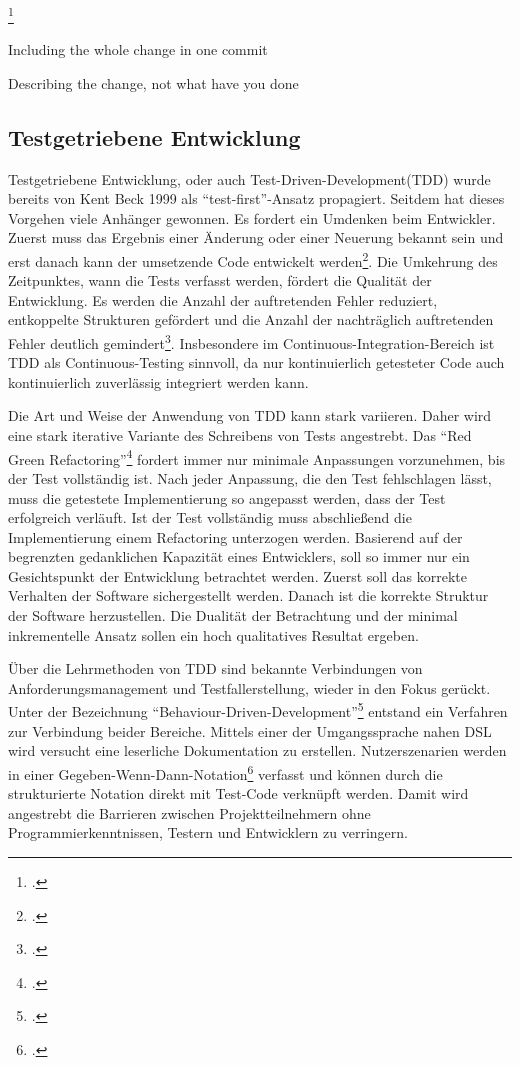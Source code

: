 \footcite[Writing commit messages before starting to code][]{git-essentials-2017}

Including the whole change in one commit

Describing the change, not what have you done

\subsection{Testgetriebene Entwicklung}
\label{test-driven-development}

Testgetriebene Entwicklung, oder auch Test-Driven-Development(TDD) wurde bereits von Kent Beck 1999 als ``test-first''-Ansatz propagiert. Seitdem hat dieses Vorgehen viele Anhänger gewonnen. Es fordert ein Umdenken beim Entwickler. Zuerst muss das Ergebnis einer Änderung oder einer Neuerung bekannt sein und erst danach kann der umsetzende Code entwickelt werden\footcite[vgl.][Kap. Understanding TDD]{tdd-java}. Die Umkehrung des Zeitpunktes, wann die Tests verfasst werden, fördert die Qualität der Entwicklung. Es werden die Anzahl der auftretenden Fehler reduziert, entkoppelte Strukturen gefördert und die Anzahl der nachträglich auftretenden Fehler deutlich gemindert\footcite[vgl.][]{tdd-ci-effectivness}.
Insbesondere im Continuous-Integration-Bereich ist TDD als Continuous-Testing sinnvoll, da nur kontinuierlich getesteter Code auch kontinuierlich zuverlässig integriert werden kann.

Die Art und Weise der Anwendung von TDD kann stark variieren. Daher wird eine stark iterative Variante des Schreibens von Tests angestrebt. Das ``Red Green Refactoring''\footcite[vgl.][Kap. 
Red-Green-Refactor
]{tdd-java} fordert immer nur minimale Anpassungen vorzunehmen, bis der Test vollständig ist. Nach jeder Anpassung, die den Test fehlschlagen lässt, muss die getestete Implementierung so angepasst werden, dass der Test erfolgreich verläuft. Ist der Test vollständig muss abschließend die Implementierung einem Refactoring unterzogen werden. Basierend auf der begrenzten gedanklichen Kapazität eines Entwicklers, soll so immer nur ein Gesichtspunkt der Entwicklung betrachtet werden. Zuerst soll das korrekte Verhalten der Software sichergestellt werden. Danach ist die korrekte Struktur der Software herzustellen. Die Dualität der Betrachtung und der minimal inkrementelle Ansatz sollen ein hoch qualitatives Resultat ergeben.

Über die Lehrmethoden von TDD sind bekannte Verbindungen von Anforderungsmanagement und Testfallerstellung, wieder in den Fokus gerückt. Unter der Bezeichnung ``Behaviour-Driven-Development''\footcite{bdd-north} entstand ein Verfahren zur Verbindung beider Bereiche. Mittels einer der Umgangssprache nahen DSL wird versucht eine leserliche Dokumentation zu erstellen. Nutzerszenarien werden in einer Gegeben-Wenn-Dann-Notation\footcite{fowler-gwt} verfasst und können durch die strukturierte Notation direkt mit Test-Code verknüpft werden. Damit wird angestrebt die Barrieren zwischen Projektteilnehmern ohne Programmierkenntnissen, Testern und Entwicklern zu verringern.

